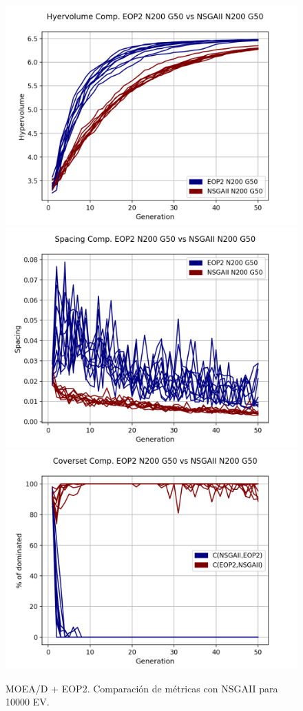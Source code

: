 \begin{figure}[H]
\includegraphics[scale=0.35]{../METRICS_PLOTS/Hypervol_COMP_EOP2N200G50_NSGAIIN200G50.png}
\includegraphics[scale=0.35]{../METRICS_PLOTS/Spacing_COMP_EOP2N200G50_NSGAIIN200G50.png}
\includegraphics[scale=0.35]{../METRICS_PLOTS/CoverSet_COMP_EOP2N200G50_NSGAIIN200G50.png}\\
\caption{MOEA/D + EOP2. Comparación de métricas con NSGAII para 10000 EV.}
\label{fig:15}
\end{figure}


